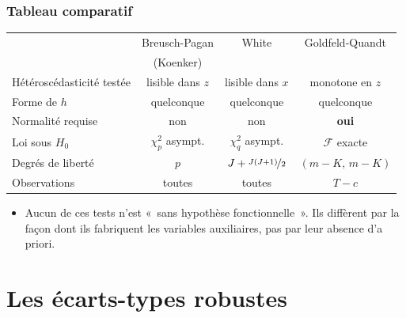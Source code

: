 \documentclass[10pt]{beamer}
\begin{document}
\begin{frame}
  \frametitle{Tableau comparatif}

  \begin{center}
    \small
    \renewcommand{\arraystretch}{1.35}
    \setlength{\tabcolsep}{4pt}
    \begin{tabular}{lccc}
      \toprule
                        & Breusch-Pagan     & White             & Goldfeld-Quandt\\
                        & (Koenker)         &                   & \\
      \midrule
      Hétéroscédasticité testée
                        & lisible dans $z$  & lisible dans $x$  & monotone en $z$\\
      Forme de $h$      & quelconque        & quelconque        & quelconque\\
      Normalité requise & non               & non               & \textbf{oui}\\
      Loi sous $H_0$    & $\chi^2_p$ asympt.& $\chi^2_q$ asympt.& $\mathcal F$ exacte\\
      Degrés de liberté & $p$               & $J+\nicefrac{J(J+1)}{2}$ & $(m-K,\,m-K)$\\
      Observations      & toutes            & toutes            & $T-c$\\
      \bottomrule
    \end{tabular}
  \end{center}

  \bigskip

  \begin{itemize}

  \item[\dbend] Aucun de ces tests n'est «~sans hypothèse fonctionnelle~». Ils
    diffèrent par la façon dont ils fabriquent les variables auxiliaires, pas
    par leur absence d'a priori.

  \end{itemize}

\end{frame}


\section{Les écarts-types robustes}
\end{document}

